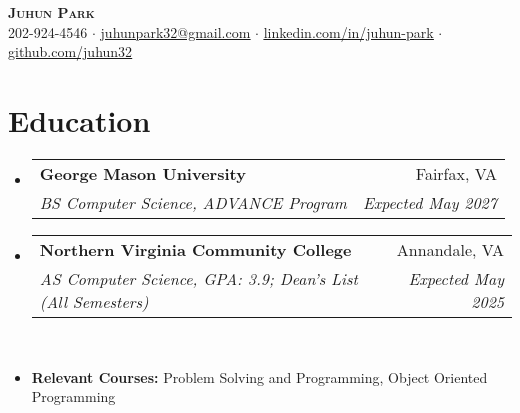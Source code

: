 \documentclass[letterpaper,11pt]{article}
\makeatletter
\newcommand{\resumeItem}[1]{
  \item\small{
    {#1 \vspace{-5pt}}
  }
}
\newcommand{\resumeSubheading}[4]{
  \vspace{-2pt}\item
    \begin{tabular*}{0.97\textwidth}[t]{l@{\extracolsep{\fill}}r@{\hspace{-0.2in}}}
        \textbf{#1} & #2 \\
        \textit{\small#3} & \textit{\small #4} \\
    \end{tabular*}\vspace{-7pt}
}
\newcommand{\resumeSubHeadingListStart}{\begin{itemize}[leftmargin=0.00in, rightmargin=-0.2in, label={}]}
\newcommand{\resumeSubHeadingListEnd}{\end{itemize}}
\makeatother
\begin{document}

\begin{center}
    \textbf{\Huge \scshape {Juhun Park}} \\ \vspace{1pt}
    \small 202-924-4546 $\cdot$ 
    \href{mailto:riann3207@gmail.com}{\underline{juhunpark32@gmail.com}} $\cdot$
    \href{https://linkedin.com/in/juhun-park}{\underline{linkedin.com/in/juhun-park}} $\cdot$
    \href{https://github.com/juhun32}{\underline{github.com/juhun32}} \\
\end{center}


\section{Education}
    \resumeSubHeadingListStart
        \resumeSubheading
            {George Mason University}{Fairfax, VA}
            {BS Computer Science, ADVANCE Program}{Expected May 2027}

        \resumeSubheading
            {Northern Virginia Community College}{Annandale, VA}
            {AS Computer Science, GPA: 3.9; Dean's List (All Semesters)}{Expected May 2025} \\
        
        \resumeItem{\textbf{Relevant Courses: }{Problem Solving and Programming, Object Oriented Programming}}
    \resumeSubHeadingListEnd

\end{document}
